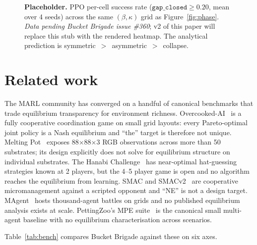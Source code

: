 \documentclass{anvil-paper}
\begin{document}
\begin{figure}[t]
  \centering
  
  \caption{\textbf{Placeholder.} PPO per-cell success rate
  ($\texttt{gap\_closed}\geq 0.20$, mean over 4 seeds) across the same
  $(\beta,\kappa)$ grid as Figure~\ref{fig:phase}. \emph{Data pending Bucket
  Brigade issue \#360}; v2 of this paper will replace this stub with the
  rendered heatmap. The analytical prediction is
  \textsf{symmetric}~$>$~\textsf{asymmetric}~$>$~\textsf{collapse}.}
  \label{fig:ppo}
\end{figure}

\section{Related work}
\label{sec:related}

The MARL community has converged on a handful of canonical benchmarks that
trade equilibrium transparency for environment richness.
Overcooked-AI~\citep{overcooked2019} is a fully cooperative coordination
game on small grid layouts: every Pareto-optimal joint policy is a Nash
equilibrium and ``the'' target is therefore not unique. Melting
Pot~\citep{meltingpot2021} exposes 88$\times$88$\times$3 RGB observations
across more than 50 substrates; its design explicitly does not solve for
equilibrium structure on individual substrates. The Hanabi
Challenge~\citep{hanabi2020} has near-optimal hat-guessing strategies known
at 2 players, but the 4--5 player game is open and no algorithm reaches the
equilibrium from learning. SMAC and SMACv2~\citep{smac2019,smacv2_2023} are
cooperative micromanagement against a scripted opponent and ``NE'' is not a
design target. MAgent~\citep{magent2018} hosts thousand-agent battles on
grids and no published equilibrium analysis exists at scale.
PettingZoo's MPE suite~\citep{pettingzoo2021} is the canonical small
multi-agent baseline with no equilibrium characterisation across scenarios.

Table~\ref{tab:bench} compares Bucket Brigade against these on six axes.
\end{document}
